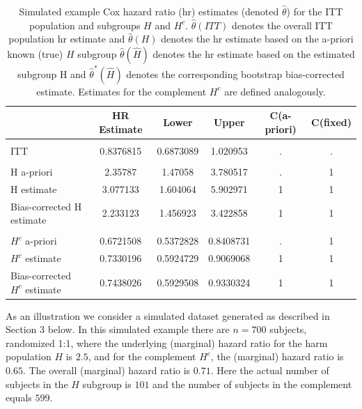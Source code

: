 \documentclass[smallextended]{svjour3}
\begin{document}
\begin{table}

\caption{\label{tab:unnamed-chunk-5}\label{tab:simex1} Simulated example Cox hazard ratio (hr) estimates (denoted $\hat\theta$) for the ITT population and subgroups $H$ and $H^{c}$.
$\hat\theta(ITT)$ denotes the overall ITT population hr estimate and $\hat\theta(H)$ denotes the hr estimate based on the a-priori known (true) $H$ subgroup
$\hat\theta(\hat{H})$ denotes the hr estimate based on the estimated subgroup H and $\hat\theta^{*}(\hat{H})$ denotes the corresponding bootstrap bias-corrected estimate.  
Estimates for the complement $H^{c}$ are defined analogously.}
\centering
\begin{tabular}[t]{lccccc}
\toprule
  & HR Estimate & Lower & Upper & C(a-priori) & C(fixed)\\
\midrule
\addlinespace[0.3em]
\multicolumn{6}{l}{\textbf{ITT}}\\
\hspace{1em}ITT & 0.8376815 & 0.6873089 & 1.020953 & . & .\\
\addlinespace[0.3em]
\multicolumn{6}{l}{\textbf{H subgroup estimates}}\\
\hspace{1em}H a-priori & 2.35787 & 1.47058 & 3.780517 & . & 1\\
\hspace{1em}H estimate & 3.077133 & 1.604064 & 5.902971 & 1 & 1\\
\hspace{1em}Bias-corrected H estimate & 2.233123 & 1.456923 & 3.422858 & 1 & 1\\
\addlinespace[0.3em]
\multicolumn{6}{l}{\textbf{H-complement subgroup estimates}}\\
\hspace{1em}$H^{c}$ a-priori & 0.6721508 & 0.5372828 & 0.8408731 & . & 1\\
\hspace{1em}$H^{c}$ estimate & 0.7330196 & 0.5924729 & 0.9069068 & 1 & 1\\
\hspace{1em}Bias-corrected $H^{c}$ estimate & 0.7438026 & 0.5929508 & 0.9330324 & 1 & 1\\
\bottomrule
\end{tabular}
\end{table}





As an illustration we consider a simulated dataset generated as described in Section 3 below.   In this simulated example there are 
$n=700$ subjects, randomized 1:1, where the underlying (marginal) hazard ratio for the harm population $H$ is $2.5$, and for the complement $H^{c}$, the (marginal) hazard ratio is $0.65$.  The overall (marginal) hazard ratio 
is $0.71$.  Here the actual number of subjects in the $H$ subgroup is 
$101$ and the number of subjects in the complement equals $599$.  
\end{document}
